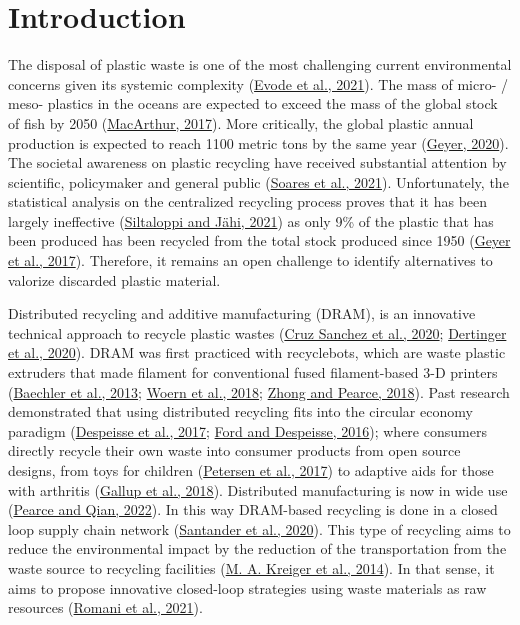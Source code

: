 \documentclass[
  12pt,
  number,
  review]{elsarticle}
\begin{document}
\newpage

\hypertarget{introduction}{%
\section{Introduction}\label{introduction}}

The disposal of plastic waste is one of the most challenging current
environmental concerns given its systemic complexity
(\protect\hyperlink{ref-evode2021}{Evode et al., 2021}). The mass of
micro- / meso- plastics in the oceans are expected to exceed the mass of
the global stock of fish by 2050
(\protect\hyperlink{ref-macarthur2017}{MacArthur, 2017}). More
critically, the global plastic annual production is expected to reach
1100 metric tons by the same year
(\protect\hyperlink{ref-geyer2020}{Geyer, 2020}). The societal awareness
on plastic recycling have received substantial attention by scientific,
policymaker and general public
(\protect\hyperlink{ref-soares2021}{Soares et al., 2021}).
Unfortunately, the statistical analysis on the centralized recycling
process proves that it has been largely ineffective
(\protect\hyperlink{ref-Siltaloppi2021}{Siltaloppi and Jähi, 2021}) as
only 9\% of the plastic that has been produced has been recycled from
the total stock produced since 1950
(\protect\hyperlink{ref-Geyer2017}{Geyer et al., 2017}). Therefore, it
remains an open challenge to identify alternatives to valorize discarded
plastic material.

Distributed recycling and additive manufacturing (DRAM), is an
innovative technical approach to recycle plastic wastes
(\protect\hyperlink{ref-cruzsanchez2020}{Cruz Sanchez et al., 2020};
\protect\hyperlink{ref-dertinger2020}{Dertinger et al., 2020}). DRAM was
first practiced with recyclebots, which are waste plastic extruders that
made filament for conventional fused filament-based 3-D printers
(\protect\hyperlink{ref-baechler2013}{Baechler et al., 2013};
\protect\hyperlink{ref-woern2018}{Woern et al., 2018};
\protect\hyperlink{ref-zhong2018}{Zhong and Pearce, 2018}). Past
research demonstrated that using distributed recycling fits into the
circular economy paradigm
(\protect\hyperlink{ref-Despeisse2016}{Despeisse et al., 2017};
\protect\hyperlink{ref-Ford2016}{Ford and Despeisse, 2016}); where
consumers directly recycle their own waste into consumer products from
open source designs, from toys for children
(\protect\hyperlink{ref-Petersen2017}{Petersen et al., 2017}) to
adaptive aids for those with arthritis
(\protect\hyperlink{ref-gallup2018}{Gallup et al., 2018}). Distributed
manufacturing is now in wide use
(\protect\hyperlink{ref-pearce2022}{Pearce and Qian, 2022}). In this way
DRAM-based recycling is done in a closed loop supply chain network
(\protect\hyperlink{ref-santander2020}{Santander et al., 2020}). This
type of recycling aims to reduce the environmental impact by the
reduction of the transportation from the waste source to recycling
facilities (\protect\hyperlink{ref-kreiger2014}{M. A. Kreiger et al.,
2014}). In that sense, it aims to propose innovative closed-loop
strategies using waste materials as raw resources
(\protect\hyperlink{ref-romani2021}{Romani et al., 2021}).
\end{document}
